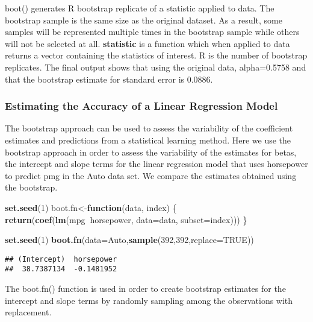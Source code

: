 \documentclass[]{article}
\newenvironment{Shaded}{\begin{snugshade}}{\end{snugshade}}
\newcommand{\KeywordTok}[1]{\textcolor[rgb]{0.13,0.29,0.53}{\textbf{#1}}}
\newcommand{\DataTypeTok}[1]{\textcolor[rgb]{0.13,0.29,0.53}{#1}}
\newcommand{\DecValTok}[1]{\textcolor[rgb]{0.00,0.00,0.81}{#1}}
\newcommand{\OtherTok}[1]{\textcolor[rgb]{0.56,0.35,0.01}{#1}}
\newcommand{\ControlFlowTok}[1]{\textcolor[rgb]{0.13,0.29,0.53}{\textbf{#1}}}
\newcommand{\OperatorTok}[1]{\textcolor[rgb]{0.81,0.36,0.00}{\textbf{#1}}}
\newcommand{\NormalTok}[1]{#1}
\begin{document}
boot() generates R bootstrap replicate of a statistic applied to data.
The bootstrap sample is the same size as the original dataset. As a
result, some samples will be represented multiple times in the bootstrap
sample while others will not be selected at all. \textbf{statistic} is a
function which when applied to data returns a vector containing the
statistics of interest. R is the number of bootstrap replicates. The
final output shows that using the original data, alpha=0.5758 and that
the bootstrap estimate for standard error is 0.0886.

\subsubsection{Estimating the Accuracy of a Linear Regression
Model}\label{estimating-the-accuracy-of-a-linear-regression-model}

The bootstrap approach can be used to assess the variability of the
coefficient estimates and predictions from a statistical learning
method. Here we use the bootstrap approach in order to assess the
variability of the estimates for betas, the intercept and slope terms
for the linear regression model that uses horsepower to predict pmg in
the Auto data set. We compare the estimates obtained using the
bootstrap.

\begin{Shaded}
\begin{Highlighting}[]
\KeywordTok{set.seed}\NormalTok{(}\DecValTok{1}\NormalTok{)}
\NormalTok{boot.fn<-}\ControlFlowTok{function}\NormalTok{(data, index) \{}
    \KeywordTok{return}\NormalTok{(}\KeywordTok{coef}\NormalTok{(}\KeywordTok{lm}\NormalTok{(mpg}\OperatorTok{~}\NormalTok{horsepower, }\DataTypeTok{data=}\NormalTok{data, }\DataTypeTok{subset=}\NormalTok{index)))}
\NormalTok{\}}

\KeywordTok{set.seed}\NormalTok{(}\DecValTok{1}\NormalTok{)}
\KeywordTok{boot.fn}\NormalTok{(}\DataTypeTok{data=}\NormalTok{Auto,}\KeywordTok{sample}\NormalTok{(}\DecValTok{392}\NormalTok{,}\DecValTok{392}\NormalTok{,}\DataTypeTok{replace=}\OtherTok{TRUE}\NormalTok{))}
\end{Highlighting}
\end{Shaded}

\begin{verbatim}
## (Intercept)  horsepower 
##  38.7387134  -0.1481952
\end{verbatim}

The boot.fn() function is used in order to create bootstrap estimates
for the intercept and slope terms by randomly sampling among the
observations with replacement.
\end{document}
